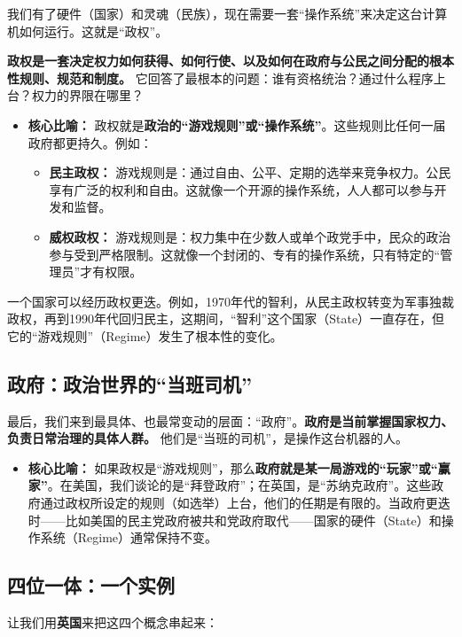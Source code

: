 \documentclass[a5paper, 11pt, openany]{ctexbook}
\begin{document}
我们有了硬件（国家）和灵魂（民族），现在需要一套“操作系统”来决定这台计算机如何运行。这就是“政权”。

\textbf{政权是一套决定权力如何获得、如何行使、以及如何在政府与公民之间分配的根本性规则、规范和制度。} 它回答了最根本的问题：谁有资格统治？通过什么程序上台？权力的界限在哪里？

\begin{itemize}
    \item \textbf{核心比喻：} 政权就是\textbf{政治的“游戏规则”或“操作系统”}。这些规则比任何一届政府都更持久。例如：
    \begin{itemize}
        \item \textbf{民主政权：} 游戏规则是：通过自由、公平、定期的选举来竞争权力。公民享有广泛的权利和自由。这就像一个开源的操作系统，人人都可以参与开发和监督。
        \item \textbf{威权政权：} 游戏规则是：权力集中在少数人或单个政党手中，民众的政治参与受到严格限制。这就像一个封闭的、专有的操作系统，只有特定的“管理员”才有权限。
    \end{itemize}
\end{itemize}
一个国家可以经历政权更迭。例如，1970年代的智利，从民主政权转变为军事独裁政权，再到1990年代回归民主，这期间，“智利”这个国家（State）一直存在，但它的“游戏规则”（Regime）发生了根本性的变化。

\subsection{政府：政治世界的“当班司机”}

最后，我们来到最具体、也最常变动的层面：“政府”。\textbf{政府是当前掌握国家权力、负责日常治理的具体人群。} 他们是“当班的司机”，是操作这台机器的人。

\begin{itemize}
    \item \textbf{核心比喻：} 如果政权是“游戏规则”，那么\textbf{政府就是某一局游戏的“玩家”或“赢家”}。在美国，我们谈论的是“拜登政府”；在英国，是“苏纳克政府”。这些政府通过政权所设定的规则（如选举）上台，他们的任期是有限的。当政府更迭时——比如美国的民主党政府被共和党政府取代——国家的硬件（State）和操作系统（Regime）通常保持不变。
\end{itemize}

\subsection{四位一体：一个实例}

让我们用\textbf{英国}来把这四个概念串起来：
\end{document}
